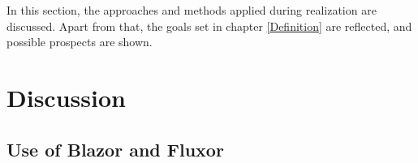 
In this section, the approaches and methods applied during realization are discussed. Apart from that, the goals set in chapter \ref{Definition} are reflected, and possible prospects are shown.

\section{Discussion}
\subsection{Use of Blazor and Fluxor}
